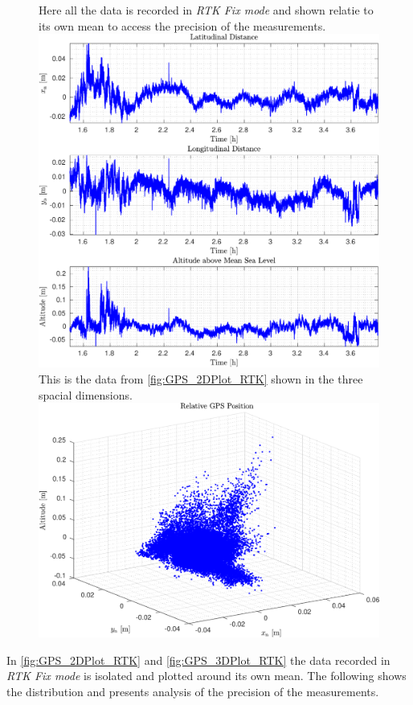 \begin{figure}[H]
  \captionbox
  {
    Here all the data is recorded in \emph{RTK Fix mode} and shown relatie to its own mean to access the precision of the measurements.
    \label{fig:GPS_2DPlot_RTK}
  }
  {
    \includegraphics[width=.45\textwidth]{figures/GPS_2DPlot_RTK}
  }
  \hspace{5pt}
  \captionbox
  {
    This is the data from \autoref{fig:GPS_2DPlot_RTK} shown in the three spacial dimensions.
    \label{fig:GPS_3DPlot_RTK}
  }
  {
    \includegraphics[width=.45\textwidth]{figures/GPS_3DPlot_RTK}
    \vspace{.8cm}
  }
\end{figure}

In \autoref{fig:GPS_2DPlot_RTK} and \autoref{fig:GPS_3DPlot_RTK} the data recorded in \emph{RTK Fix mode} is isolated and plotted around its own mean. The following shows the distribution and presents analysis of the precision of the measurements.

